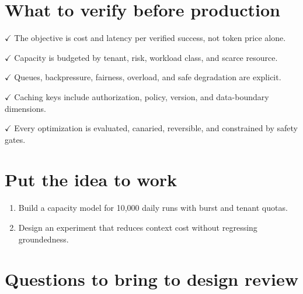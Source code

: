 \section{What to verify before production}

\textbf{\ensuremath{\checkmark}} The objective is cost and latency per verified success, not token price alone.\par

\textbf{\ensuremath{\checkmark}} Capacity is budgeted by tenant, risk, workload class, and scarce resource.\par

\textbf{\ensuremath{\checkmark}} Queues, backpressure, fairness, overload, and safe degradation are explicit.\par

\textbf{\ensuremath{\checkmark}} Caching keys include authorization, policy, version, and data-boundary dimensions.\par

\textbf{\ensuremath{\checkmark}} Every optimization is evaluated, canaried, reversible, and constrained by safety gates.\par

\section{Put the idea to work}

\begin{enumerate}

\item Build a capacity model for 10,000 daily runs with burst and tenant quotas.

\item Design an experiment that reduces context cost without regressing groundedness.

\end{enumerate}

\section{Questions to bring to design review}

